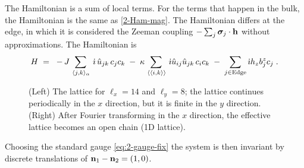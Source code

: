 The Hamiltonian is a sum of local terms. For the terms that happen in the bulk, the Hamiltonian is the same as \eqref{2-Ham-mag}. The Hamiltonian differs at the edge, in which it is considered the Zeeman coupling $-\sum_{j} \bm{\sigma}_j \cdot \bf{h}$ without approximations. %
The Hamiltonian is
\begin{equation}
    H \; = \; \; -  \, J \sum_{\, \langle j,k \rangle_{\alpha} }  \, \im \, \hat{u}_{jk} \, c_j c_k    \; - \; \kappa  \sum_{ \, \langle \langle i,k \rangle \rangle }   \, \im \hat{u}_{ij}\hat{u}_{jk} \,c_i c_k  \; - \; \sum_{j \in \text{Edge}} \im h_{z}b_{j}^{z} c_{j} \; . \label{eq:3-H}
\end{equation}
\begin{figure}[t]
  \begin{minipage}{.7\textwidth}
    \centering
    \scalebox{1.3}{}
  \end{minipage}%
  \begin{minipage}{.3\textwidth}
    \centering
    \scalebox{1.3}{}
  \end{minipage}
  \caption{(Left) The  lattice for $\ell_x = 14$ and $\ell_y=8$; the lattice continues periodically in the $x$ direction, but it is finite in the $y$ direction. (Right) After Fourier transforming in the $x$ direction, the effective lattice becomes an open chain (1D lattice). }
  \label{fig:3-lattice}
  \end{figure}
Choosing the standard gauge \eqref{eq:2-gauge-fix} the system is then invariant by discrete translations of $\bf{n}_1-\bf{n}_2=(1,0)$. 

